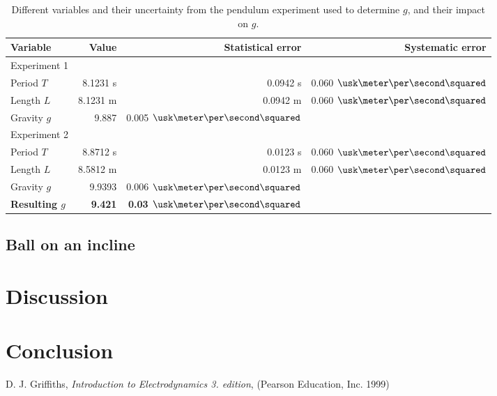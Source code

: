 \documentclass[a4paper,%
               aps,%
               prl,%
               amsfonts,%
               amssymb,%
               amsmath,%
               nobibnotes,%
               twocolumn, %
               twoside,%
               balancelastpage,%
               eqsecnum] %
               {revtex4-1}
\begin{document}
\begin{table}[h!]
  \centering
  \begin{tabular}{lrrr}
    \hline
    \hline
Variable	&Value	&Statistical error	&Systematic error\\
\hline
\quad	Experiment 1 \\
\hline
    Period $T$	&8.1231 s	&0.0942 s	&0.060 $\usk\meter\per\second\squared$\\
    Length $L$	&8.1231 m	&0.0942 m	&0.060 $\usk\meter\per\second\squared$\\
    Gravity $g$	&9.887	&0.005 $\usk\meter\per\second\squared$ &\\
\hline
\quad	Experiment 2 \\
\hline 
    Period $T$	&8.8712 s	&0.0123 s	&0.060 $\usk\meter\per\second\squared$\\ 
    Length $L$	&8.5812 m	&0.0123 m	&0.060 $\usk\meter\per\second\squared$\\
    Gravity $g$	&9.9393	&0.006 $\usk\meter\per\second\squared$ &\\    
    \hline
    \textbf{Resulting $g$}	&\textbf{9.421}	&\textbf{0.03 $\usk\meter\per\second\squared$} &\\
    \hline
    \hline
  \end{tabular}
  \caption{Different variables and their uncertainty from the pendulum experiment used to determine $g$, and their impact on $g$. \label{tab:GPen}}
\end{table}


\subsection{Ball on an incline}
\lipsum[1-3]


\section{Discussion}


\section{Conclusion}



\begin{thebibliography}{99}  
 D. J. Griffiths, \emph{Introduction to Electrodynamics 3. edition}, (Pearson Education, Inc. 1999)                                 
\end{thebibliography}
\end{document}
